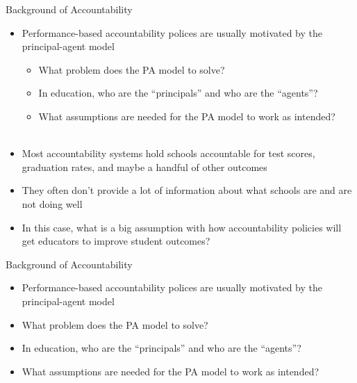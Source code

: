 \documentclass{beamer}
\begin{document}
\begin{frame}[<+->]{Background of Accountability}
	\begin{itemize}
		\item Performance-based accountability polices are usually motivated by the principal-agent model
		\begin{itemize}
			\item What problem does the PA model to solve?
			\item In education, who are the ``principals'' and who are the ``agents''?
			\item What assumptions are needed for the PA model to work as intended? \\~\\
		\end{itemize}
		
		\item Most accountability systems hold schools accountable for test scores, graduation rates, and maybe a handful of other outcomes
		\item They often don't provide a lot of information about what schools are and are not doing well
		\item In this case, what is a big assumption with how accountability policies will get educators to improve student outcomes?
	\end{itemize}
\end{frame}


\begin{frame}[<+->]{Background of Accountability}
	\begin{itemize}
		\item Performance-based accountability polices are usually motivated by the principal-agent model
		\item What problem does the PA model to solve?
		\item In education, who are the ``principals'' and who are the ``agents''?
		\item What assumptions are needed for the PA model to work as intended?
	\end{itemize}
\end{frame}
\end{document}
